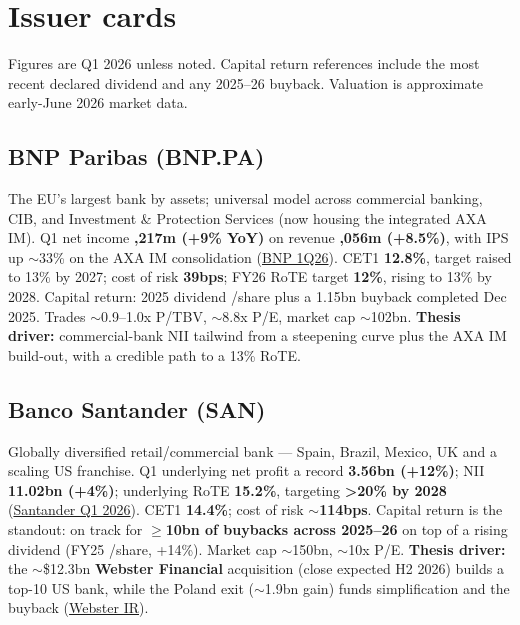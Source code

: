 \documentclass[10pt,a4paper]{article}
\begin{document}
\section{Issuer cards}

Figures are Q1 2026 unless noted. Capital return references include the most recent declared dividend and any 2025--26 buyback. Valuation is approximate early-June 2026 market data.

\subsection*{BNP Paribas (BNP.PA)}
The EU's largest bank by assets; universal model across commercial banking, CIB, and Investment \& Protection Services (now housing the integrated AXA IM). Q1 net income \textbf{,217m (+9\% YoY)} on revenue \textbf{,056m (+8.5\%)}, with IPS up $\sim$33\% on the AXA IM consolidation (\href{https://invest.bnpparibas/en/document/1q26-pr}{BNP 1Q26}). CET1 \textbf{12.8\%}, target raised to 13\% by 2027; cost of risk \textbf{39bps}; FY26 RoTE target \textbf{12\%}, rising to 13\% by 2028. Capital return: 2025 dividend /share plus a \texteuro1.15bn buyback completed Dec 2025. Trades $\sim$0.9--1.0x P/TBV, $\sim$8.8x P/E, market cap $\sim$\texteuro102bn. \textbf{Thesis driver:} commercial-bank NII tailwind from a steepening curve plus the AXA IM build-out, with a credible path to a 13\% RoTE.

\subsection*{Banco Santander (SAN)}
Globally diversified retail/commercial bank --- Spain, Brazil, Mexico, UK and a scaling US franchise. Q1 underlying net profit a record \textbf{\texteuro3.56bn (+12\%)}; NII \textbf{\texteuro11.02bn (+4\%)}; underlying RoTE \textbf{15.2\%}, targeting \textbf{>20\% by 2028} (\href{https://www.santander.com/en/press-room/press-releases/2026/04/q1-2026-santander-bank-results}{Santander Q1 2026}). CET1 \textbf{14.4\%}; cost of risk $\sim$\textbf{114bps}. Capital return is the standout: on track for \textbf{$\geq$\texteuro10bn of buybacks across 2025--26} on top of a rising dividend (FY25 /share, +14\%). Market cap $\sim$\texteuro150bn, $\sim$10x P/E. \textbf{Thesis driver:} the $\sim$\$12.3bn \textbf{Webster Financial} acquisition (close expected H2 2026) builds a top-10 US bank, while the Poland exit ($\sim$\texteuro1.9bn gain) funds simplification and the buyback (\href{https://investors.websterbank.com/News--Events/news-releases/news-details/2026/Webster-Financial-Corporation-Enters-Into-Merger-Agreement-With-Banco-Santander-S-A--for-12-3-Billion/default.aspx}{Webster IR}).
\end{document}
